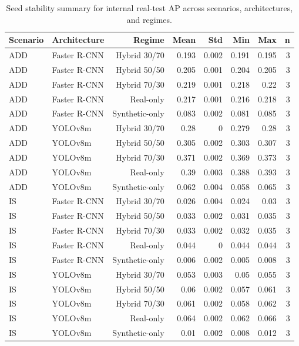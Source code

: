 \begin{table}
\caption{Seed stability summary for internal real-test AP across scenarios, architectures, and regimes.}
\label{tab:seed_stability}
\begin{tabular}{llrrrrrr}
\toprule
Scenario & Architecture & Regime & Mean & Std & Min & Max & n \\
\midrule
ADD & Faster R-CNN & Hybrid 30/70 & 0.193 & 0.002 & 0.191 & 0.195 & 3 \\
ADD & Faster R-CNN & Hybrid 50/50 & 0.205 & 0.001 & 0.204 & 0.205 & 3 \\
ADD & Faster R-CNN & Hybrid 70/30 & 0.219 & 0.001 & 0.218 & 0.22 & 3 \\
ADD & Faster R-CNN & Real-only & 0.217 & 0.001 & 0.216 & 0.218 & 3 \\
ADD & Faster R-CNN & Synthetic-only & 0.083 & 0.002 & 0.081 & 0.085 & 3 \\
ADD & YOLOv8m & Hybrid 30/70 & 0.28 & 0 & 0.279 & 0.28 & 3 \\
ADD & YOLOv8m & Hybrid 50/50 & 0.305 & 0.002 & 0.303 & 0.307 & 3 \\
ADD & YOLOv8m & Hybrid 70/30 & 0.371 & 0.002 & 0.369 & 0.373 & 3 \\
ADD & YOLOv8m & Real-only & 0.39 & 0.003 & 0.388 & 0.393 & 3 \\
ADD & YOLOv8m & Synthetic-only & 0.062 & 0.004 & 0.058 & 0.065 & 3 \\
IS & Faster R-CNN & Hybrid 30/70 & 0.026 & 0.004 & 0.024 & 0.03 & 3 \\
IS & Faster R-CNN & Hybrid 50/50 & 0.033 & 0.002 & 0.031 & 0.035 & 3 \\
IS & Faster R-CNN & Hybrid 70/30 & 0.033 & 0.002 & 0.032 & 0.035 & 3 \\
IS & Faster R-CNN & Real-only & 0.044 & 0 & 0.044 & 0.044 & 3 \\
IS & Faster R-CNN & Synthetic-only & 0.006 & 0.002 & 0.005 & 0.008 & 3 \\
IS & YOLOv8m & Hybrid 30/70 & 0.053 & 0.003 & 0.05 & 0.055 & 3 \\
IS & YOLOv8m & Hybrid 50/50 & 0.06 & 0.002 & 0.057 & 0.061 & 3 \\
IS & YOLOv8m & Hybrid 70/30 & 0.061 & 0.002 & 0.058 & 0.062 & 3 \\
IS & YOLOv8m & Real-only & 0.064 & 0.002 & 0.062 & 0.066 & 3 \\
IS & YOLOv8m & Synthetic-only & 0.01 & 0.002 & 0.008 & 0.012 & 3 \\
\bottomrule
\end{tabular}
\end{table}
